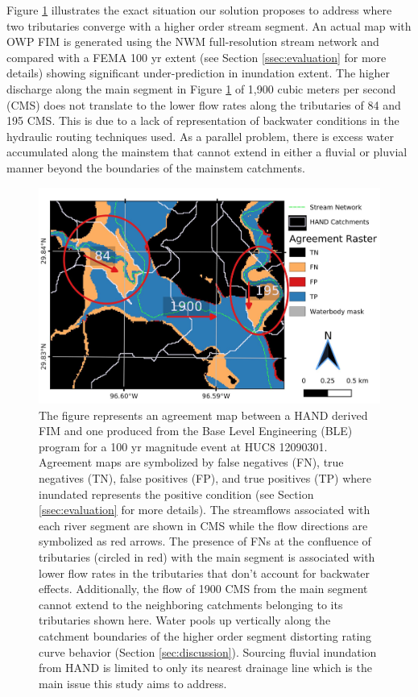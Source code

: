 \documentclass[draft]{dependencies/agujournal2019}
\begin{document}
Figure \ref{fig:catchment_boundaries_issue} illustrates the exact situation our solution proposes to address where two tributaries converge with a higher order stream segment. 
An actual map with OWP FIM is generated using the NWM full-resolution stream network and compared with a FEMA 100 yr extent (see Section \ref{ssec:evaluation} for more details) showing significant under-prediction in inundation extent.
The higher discharge along the main segment in Figure \ref{fig:catchment_boundaries_issue} of 1,900 cubic meters per second (CMS) does not translate to the lower flow rates along the tributaries of 84 and 195 CMS. 
This is due to a lack of representation of backwater conditions in the hydraulic routing techniques used.
As a parallel problem, there is excess water accumulated along the mainstem that cannot extend in either a fluvial or pluvial manner beyond the boundaries of the mainstem catchments.
%
\begin{figure}[H]
\centering
\includegraphics[scale=1.0]{figures/catchment_boundaries_issue.jpg}
\caption{The figure represents an agreement map between a HAND derived FIM and one produced from the Base Level Engineering (BLE) program for a 100 yr magnitude event at HUC8 12090301.
Agreement maps are symbolized by false negatives (FN), true negatives (TN), false positives (FP), and true positives (TP) where inundated represents the positive condition (see Section \ref{ssec:evaluation} for more details).
The streamflows associated with each river segment are shown in CMS while the flow directions are symbolized as red arrows.
The presence of FNs at the confluence of tributaries (circled in red) with the main segment is associated with lower flow rates in the tributaries that don't account for backwater effects.
Additionally, the flow of 1900 CMS from the main segment cannot extend to the neighboring catchments belonging to its tributaries shown here.
Water pools up vertically along the catchment boundaries of the higher order segment distorting rating curve behavior (Section \ref{sec:discussion}).
Sourcing fluvial inundation from HAND is limited to only its nearest drainage line which is the main issue this study aims to address.
}
\label{fig:catchment_boundaries_issue}
\end{figure}
%
\end{document}
